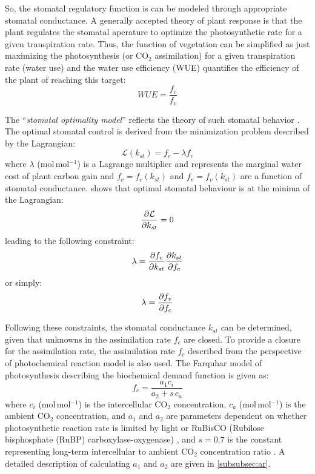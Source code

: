 So, the stomatal regulatory function is can be modeled through appropriate stomatal conductance. A generally accepted theory of plant response is that the plant regulates the stomatal aperature to optimize the photosynthetic rate for a given transpiration rate. Thus, the function of vegetation can be simplified as just maximizing the photosynthesis (or CO$_2$ assimilation) for a given transpiration rate (water use) \citep{Medlyn2011} and the water use efficiency (WUE) quantifies the efficiency of the plant of reaching this target:
\begin{equation}
\textit{WUE} = \frac{f_c}{f_v}
\label{eq:wue}
\end{equation}

The ``\textit{stomatal optimality model}'' reflects the theory of such stomatal behavior \citep{Cowan1978}. The optimal stomatal control is derived from the minimization problem described by the Lagrangian:
\begin{equation} 
\mathcal{L}(k_{st}) = f_c - \lambda f_v
\end{equation}
where $\lambda$ (mol\,mol$^{-1}$) is a Lagrange multiplier and represents the marginal water cost of plant carbon gain \citep{Medlyn2011,Katul2010,Manoli2014} and $f_c = f_c(k_{st})$ and $f_v=f_v(k_{st})$ are a function of stomatal conductance. \cite{Cowan1978} shows that optimal stomatal behaviour is at the minima of the Lagrangian:
\begin{equation}
\frac{\partial \mathcal{L}}{\partial k_{st}} = 0
\label{eq:lagrangian1}
\end{equation}
leading to the following constraint:
\begin{equation}
\lambda = \frac{\partial f_v}{\partial k_{st}}\frac{\partial k_{st}}{\partial f_c} 
\end{equation}
or simply:
\begin{equation}
\lambda = \frac{\partial f_v}{\partial f_c} 
\end{equation}

Following these constraints, the stomatal conductance $k_{\textit{st}}$ can be determined, given that unknowns in the assimilation rate $f_c$ are closed. To provide a closure for the assimilation rate, the assimilation rate $f_c$ described from the perspective of photochemical reaction model is also used. The Farquhar model of photosynthesis describing the biochemical demand function is given as:
\begin{equation}
f_c = \frac{a_1 c_i}{a_2 + s\,c_a}
\label{eq:bioassim}
\end{equation}
where $c_i$ (mol\,mol$^{-1}$)  is the intercellular CO$_2$ concentration, $c_a$ (mol\,mol$^{-1}$) is the ambient CO$_2$ concentration, and $a_1$ and $a_2$ are parameters dependent on whether photosynthetic reaction rate is limited by light or RuBisCO (Rubilose bisphosphate (RuBP) carboxylase-oxygenase) \citep{Katul2010, Farquhar1980}, and $s=0.7$ is the constant representing long-term intercellular to ambient CO$_2$ concentration ratio \citep{Volpe2013}. A detailed description of calculating $a_1$ and $a_2$ are given in \cref{subsubsec:ar}.

